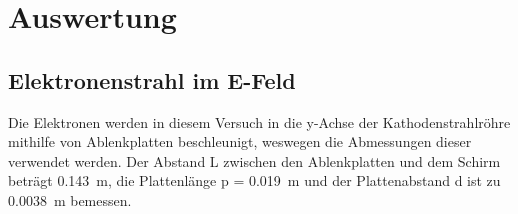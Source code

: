 
\section{Auswertung}
%
\subsection{Elektronenstrahl im E-Feld}
%
Die Elektronen werden in diesem Versuch in die y-Achse der
Kathodenstrahlröhre mithilfe von Ablenkplatten beschleunigt, weswegen
die Abmessungen dieser verwendet werden. Der Abstand L zwischen den
Ablenkplatten und dem Schirm beträgt \SI{0.143}{\metre}, die
Plattenlänge p = \SI{0.019}{\metre} und der Plattenabstand d ist zu
\SI{0.0038}{\metre} bemessen.
%
